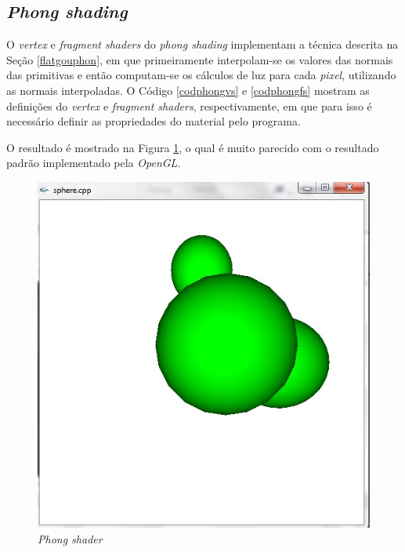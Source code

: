 \subsection{\textit{Phong shading}}

	O \textit{vertex} e \textit{fragment shaders} do \textit{phong shading} implementam a técnica descrita na Seção \ref{flatgouphon}, em que primeiramente interpolam-se os valores das normais das primitivas e então computam-se os cálculos de luz para cada \textit{pixel}, utilizando as normais interpoladas. O Código \ref{codphongvs} e \ref{codphongfs} mostram as definições do \textit{vertex} e \textit{fragment shaders}, respectivamente, em que para isso é necessário definir as propriedades do material pelo programa.  

	

	


	O resultado é mostrado na  Figura \ref{phong_shader}, o qual é muito parecido com o resultado padrão implementado pela  \textit{OpenGL}.

	\begin{figure}[h]
	\centering
		\includegraphics[keepaspectratio=true,scale=0.55]{figuras/phong_shader.jpg}
	\caption{\textit{Phong shader}}
	\label{phong_shader}
	\end{figure}

